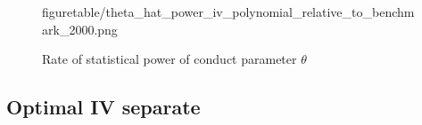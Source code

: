 \documentclass[11pt, a4paper]{article}
\begin{document}
\begin{figure}[!ht]
\begin{center}
{  {figuretable/theta_hat_power_iv_polynomial_relative_to_benchmark_2000.png}}
  \caption{Rate of statistical power of conduct parameter $\theta$}
  \label{fg:theta_hat_power_iv_polynomial_relative_to_benchmark}
  \end{center}
\end{figure} 


\subsection{Optimal IV separate}
\end{document}

